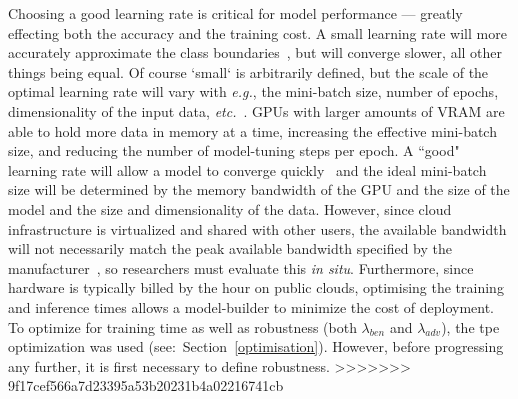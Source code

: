 \documentclass[sn-mathphys-num]{sn-jnl}%
\begin{document}
Choosing a good learning rate is critical for model performance --- greatly effecting both the accuracy and the training cost. A small learning rate will more accurately approximate the class boundaries~\cite{cao2019generalization}, but will converge slower, all other things being equal. Of course `small` is arbitrarily defined, but the scale of the optimal learning rate will vary with \textit{e.g.}, the mini-batch size, number of epochs, dimensionality of the input data, \textit{etc.}~\cite{granziol2022learning}. GPUs with larger amounts of VRAM are able to hold more data in memory at a time, increasing the effective mini-batch size, and reducing the number of model-tuning steps per epoch. A ``good" learning rate will allow a model to converge quickly~\cite{smith2019super,granziol2022learning} and the ideal mini-batch size will be determined by the memory bandwidth of the GPU and the size of the model and the size and dimensionality of the data. However, since cloud infrastructure is virtualized and shared with other users, the available bandwidth will not necessarily match the peak available bandwidth specified by the manufacturer~\cite{sajid2013cloud}, so researchers must evaluate this \textit{in situ}. Furthermore, since hardware is typically billed by the hour on public clouds, optimising the training and inference times allows a model-builder to minimize the cost of deployment. To optimize for training time as well as robustness (both $\lambda_{ben}$ and $\lambda_{adv}$), the \acrshort{tpe} optimization was used (see:~Section~\ref{optimisation}). However, before progressing any further, it is first necessary to define robustness.
>>>>>>> 9f17cef566a7d23395a53b20231b4a02216741cb
\end{document}
